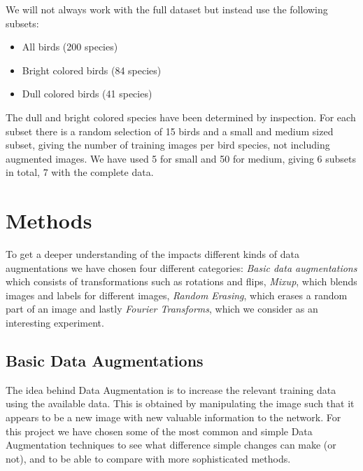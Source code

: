 \documentclass{article}
\begin{document}
We will not always work with the full dataset but instead use the following subsets:

\begin{itemize}
	\item All birds (200 species)
	\item Bright colored birds (84 species)
	\item Dull colored birds (41 species)
\end{itemize}

The dull and bright colored species have been determined by inspection. For each subset there is a random selection of 15 birds and a small and medium sized subset, giving the number of training images per bird species, not including augmented images. We have used 5 for small and 50 for medium, giving 6 subsets in total, 7 with the complete data.


\section{Methods}




To get a deeper understanding of the impacts different kinds of data augmentations 
we have chosen four different categories: \textit{Basic data augmentations} which consists of transformations such as rotations and flips, 
 \textit{Mixup}, which blends images and labels for different images, \textit{Random Erasing}, which erases a random part of an image and lastly 
\textit{Fourier Transforms}, which we consider as an interesting experiment.

\subsection{Basic Data Augmentations}
The idea behind Data Augmentation is to increase the relevant training data using the available data. This is obtained by manipulating the image such that it appears to be a new image with new valuable information to the network. For this project we have chosen some of the most common and simple Data Augmentation techniques to see what difference simple changes can make (or not), and to be able to compare with more sophisticated methods. 
\end{document}
